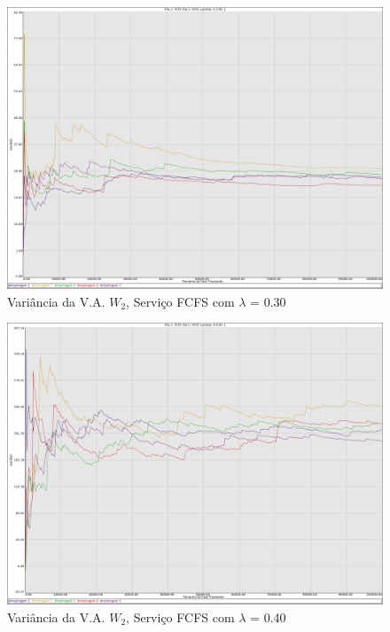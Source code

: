\documentclass[a4paper,10pt]{article}
\begin{document}
\begin{figure}
	\caption{Variância da V.A. $W_2$, Serviço FCFS com $\lambda$ = 0.30}
	\label{figTransienteFCFSfila2VarWLambda030}
	\includegraphics[scale = 0.20]{./graficos_transiente_2/03.png}
\end{figure}

\begin{figure}
	\caption{Variância da V.A. $W_2$, Serviço FCFS com $\lambda$ = 0.40}
	\label{figTransienteFCFSfila2VarWLambda040}
	\includegraphics[scale = 0.20]{./graficos_transiente_2/04.png}
\end{figure}
\end{document}
